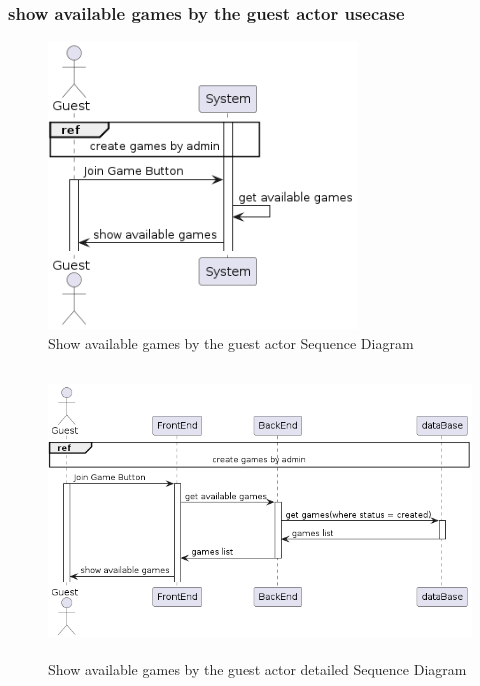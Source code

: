 \documentclass{article}
\begin{document}
\subsubsection{show available games by the guest actor usecase}
\begin{figure}[H]
	\centering
	\includegraphics[height=3in]{../thesis_tex/assets/diagrams/guest_show_available_games_SD.png}
	\caption{Show available games by the guest actor Sequence Diagram}
\end{figure}

\begin{figure}[H]
	\centering
	\includegraphics[height=3in]{../thesis_tex/assets/diagrams/guest_show_available_games_detailedSD.png}
	\caption{Show available games by the guest actor detailed Sequence Diagram}
\end{figure}
\end{document}
